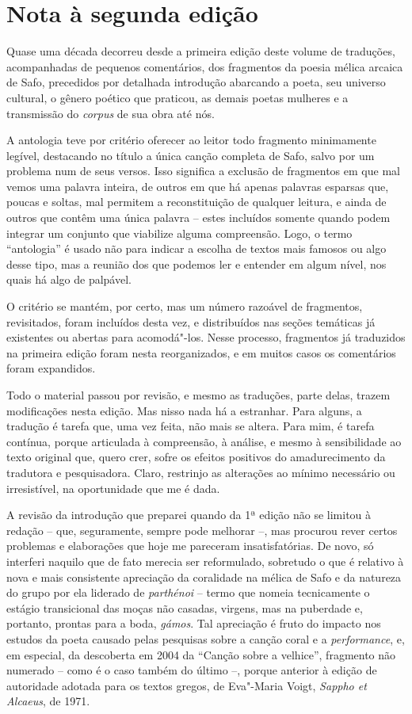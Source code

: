 \chapter{Nota à segunda edição}

Quase uma década decorreu desde a primeira edição deste volume de traduções,
acompanhadas de pequenos comentários, dos fragmentos da poesia mélica
arcaica de Safo, precedidos por detalhada introdução abarcando a poeta, seu
universo cultural, o gênero poético que praticou, as demais poetas
mulheres e a transmissão do \textit{corpus} de sua obra até nós.

A antologia teve por critério oferecer ao leitor todo fragmento
minimamente legível, destacando no título a única canção completa de Safo, 
salvo por um problema num de seus versos. Isso significa a exclusão de fragmentos em que mal
vemos uma palavra inteira, de outros em que há apenas
palavras esparsas que, poucas e soltas, mal permitem a reconstituição de
qualquer leitura, e ainda de outros que contêm uma única palavra --
estes incluídos somente quando podem integrar um conjunto que viabilize
alguma compreensão. Logo, o termo ``antologia'' é usado não para indicar 
a escolha de textos mais famosos ou algo desse
tipo, mas a reunião dos que podemos ler e entender
em algum nível, nos quais há algo de palpável.

O critério se mantém, por certo, mas um número razoável de fragmentos, revisitados,
foram incluídos desta vez, e distribuídos nas seções temáticas já
existentes ou abertas para acomodá"-los. Nesse processo, fragmentos já 
traduzidos na primeira edição foram nesta reorganizados, e 
em muitos casos os comentários foram expandidos.

Todo o material passou por revisão, e mesmo as traduções, parte delas,
trazem modificações nesta edição. Mas nisso nada há a estranhar. Para alguns, a
tradução é tarefa que, uma vez feita, não mais se altera. Para mim,
é tarefa contínua, porque articulada à compreensão, à análise,
e mesmo à sensibilidade ao texto original que, quero crer, sofre os
efeitos positivos do amadurecimento da tradutora e pesquisadora. Claro, restrinjo as
alterações ao mínimo necessário ou irresistível, na oportunidade que
me é dada.

A revisão da introdução que preparei quando da 1ª edição não
se limitou à redação -- que, seguramente, sempre pode melhorar --, mas
procurou rever certos problemas e elaborações que hoje me pareceram
insatisfatórias. De novo, só interferi naquilo que de fato merecia ser
reformulado, sobretudo o que é relativo à nova e mais consistente
apreciação da coralidade na mélica de Safo e da natureza do grupo por
ela liderado de \textit{parthénoi} -- termo que nomeia tecnicamente o
estágio transicional das moças não casadas, virgens, mas na puberdade
e, portanto, prontas para a boda, \textit{gámos}. Tal apreciação é fruto
do impacto nos estudos da poeta causado pelas pesquisas sobre a canção
coral e a \textit{performance}, e, em especial, da descoberta em 2004
da ``Canção sobre a velhice'', fragmento não numerado -- como é o caso também do último --, 
porque anterior à edição de autoridade adotada para os textos gregos, 
de Eva"-Maria Voigt, \textit{Sappho et Alcaeus}, de 1971.

